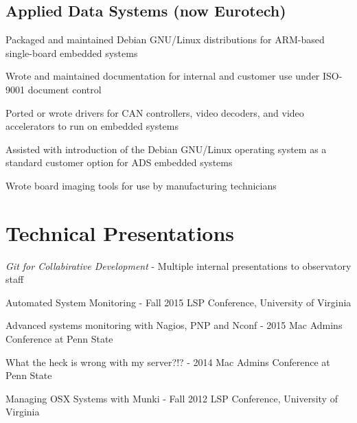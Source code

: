 \documentclass[letterpaper]{deedy-resume}
\begin{document}
\begin{minipage}[t]{0.69\textwidth}
\vspace{6pt}
\subsection{Applied Data Systems (now Eurotech)}
\vspace{2pt}

\begin{tightitemize}
	\item Packaged and maintained Debian GNU/Linux distributions for ARM-based single-board embedded systems
	\item Wrote and maintained documentation for internal and customer use under ISO-9001 document control
	\item Ported or wrote drivers for CAN controllers, video decoders, and video accelerators to run on embedded systems
	\item Assisted with introduction of the Debian GNU/Linux operating system as a	standard customer option for ADS embedded systems
	\item Wrote board imaging tools for use by manufacturing technicians
\end{tightitemize}

\end{minipage}
\newpage

\section{Technical Presentations}
\begin{tightitemize}
\vspace{8pt}
\item \textit{Git for Collabirative Development} - Multiple internal presentations to observatory staff
\item Automated System Monitoring - Fall 2015 LSP Conference, University of Virginia \\
\item Advanced systems monitoring with Nagios, PNP and Nconf - 2015 Mac Admins Conference at Penn State \\
\item What the heck is wrong with my server?!? - 2014 Mac Admins Conference at Penn State \\
\item Managing OSX Systems with Munki - Fall 2012 LSP Conference, University of
Virginia \\
\end{tightitemize}
\end{document}
